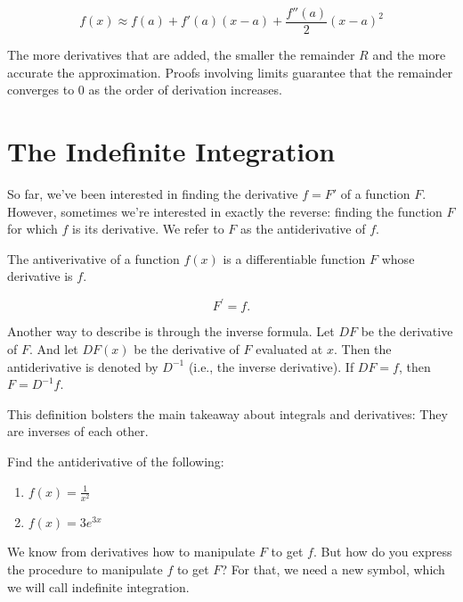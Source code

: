\documentclass[]{book}
\providecommand{\tightlist}{%
  \setlength{\itemsep}{0pt}\setlength{\parskip}{0pt}}
\theoremstyle{definition}
\theoremstyle{definition}
\theoremstyle{definition}
\theoremstyle{remark}
\let\BeginKnitrBlock\begin \let\EndKnitrBlock\end
\begin{document}
\[f(x) \approx f(a) + f'(a)(x-a) +  \dfrac{f''(a)}{2} (x-a)^2\]

The more derivatives that are added, the smaller the remainder \(R\) and the more accurate the approximation. Proofs involving limits guarantee that the remainder converges to 0 as the order of derivation increases.

\hypertarget{the-indefinite-integration}{%
\section{The Indefinite Integration}\label{the-indefinite-integration}}

So far, we've been interested in finding the derivative \(f=F'\) of a function \(F\). However, sometimes we're interested in exactly the reverse: finding the function \(F\) for which \(f\) is its derivative. We refer to \(F\) as the antiderivative of \(f\).

\BeginKnitrBlock{definition}[Antiderivative]
\protect\hypertarget{def:unnamed-chunk-20}{}{\label{def:unnamed-chunk-20} {} }The antiverivative of a function \(f(x)\) is a differentiable function \(F\) whose derivative is \(f\).

\[F^\prime = f.\]
\EndKnitrBlock{definition}

Another way to describe is through the inverse formula. Let \(DF\) be the derivative of \(F\). And let \(DF(x)\) be the derivative of \(F\) evaluated at \(x\). Then the antiderivative is denoted by \(D^{-1}\) (i.e., the inverse derivative). If \(DF=f\), then \(F=D^{-1}f\).

This definition bolsters the main takeaway about integrals and derivatives: They are inverses of each other.

\BeginKnitrBlock{exercise}[Antiderivative]
\protect\hypertarget{exr:unnamed-chunk-21}{}{\label{exr:unnamed-chunk-21} {} }Find the antiderivative of the following:

\begin{enumerate}
\def\labelenumi{\arabic{enumi}.}
\tightlist
\item
  \(f(x) = \frac{1}{x^2}\)
\item
  \(f(x) = 3e^{3x}\)
\end{enumerate}
\EndKnitrBlock{exercise}

We know from derivatives how to manipulate \(F\) to get \(f\). But how do you express the procedure to manipulate \(f\) to get \(F\)? For that, we need a new symbol, which we will call indefinite integration.
\end{document}
